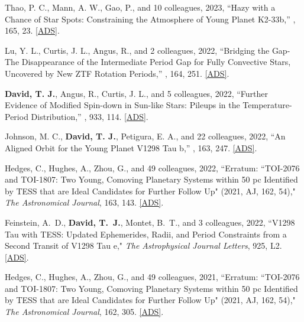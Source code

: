 \item {{Thao}, P. C.}, {{Mann}, A. W.}, {{Gao}, P.}, and 10 colleagues, 2023, ``{Hazy with a Chance of Star Spots: Constraining the Atmosphere of Young Planet K2-33b},'' \textit{\aj}, 165, 23. \href{https://ui.adsabs.harvard.edu/abs/2023AJ....165...23T}{[ADS]}.

\item {{Lu}, Y. L.}, {{Curtis}, J. L.}, {{Angus}, R.}, and 2 colleagues, 2022, ``{Bridging the Gap-The Disappearance of the Intermediate Period Gap for Fully Convective Stars, Uncovered by New ZTF Rotation Periods},'' \textit{\aj}, 164, 251. \href{https://ui.adsabs.harvard.edu/abs/2022AJ....164..251L}{[ADS]}.

\item {{\bf{David}, T. J.}}, {{Angus}, R.}, {{Curtis}, J. L.}, and 5 colleagues, 2022, ``{Further Evidence of Modified Spin-down in Sun-like Stars: Pileups in the Temperature-Period Distribution},'' \textit{\apj}, 933, 114. \href{https://ui.adsabs.harvard.edu/abs/2022ApJ...933..114D}{[ADS]}.

\item {{Johnson}, M. C.}, {{\bf{David}, T. J.}}, {{Petigura}, E. A.}, and 22 colleagues, 2022, ``{An Aligned Orbit for the Young Planet V1298 Tau b},'' \textit{\aj}, 163, 247. \href{https://ui.adsabs.harvard.edu/abs/2022AJ....163..247J}{[ADS]}.

\item {{Hedges}, C., {Hughes}, A., {Zhou}, G., and 49 colleagues}, 2022, ``{Erratum: ``TOI-2076 and TOI-1807: Two Young, Comoving Planetary Systems within 50 pc Identified by TESS that are Ideal Candidates for Further Follow Up" (2021, AJ, 162, 54)}," \textit{The Astronomical Journal}, 163, 143. \href{https://ui.adsabs.harvard.edu/abs/2022AJ....163..143H/abstract}{[ADS]}.

\item {{Feinstein}, A.~D., \textbf{{David}, T.~J.}, {Montet}, B.~T., and 3 colleagues}, 2022, ``{V1298 Tau with TESS: Updated Ephemerides, Radii, and Period Constraints from a Second Transit of V1298 Tau e}," \textit{The Astrophysical Journal Letters}, 925, L2. \href{https://ui.adsabs.harvard.edu/abs/2022ApJ...925L...2F/abstract}{[ADS]}.

\item {{Hedges}, C., {Hughes}, A., {Zhou}, G., and 49 colleagues}, 2021, ``{Erratum: ``TOI-2076 and TOI-1807: Two Young, Comoving Planetary Systems within 50 pc Identified by TESS that are Ideal Candidates for Further Follow Up" (2021, AJ, 162, 54)}," \textit{The Astronomical Journal}, 162, 305. \href{https://ui.adsabs.harvard.edu/abs/2021AJ....162..305H/abstract}{[ADS]}.

